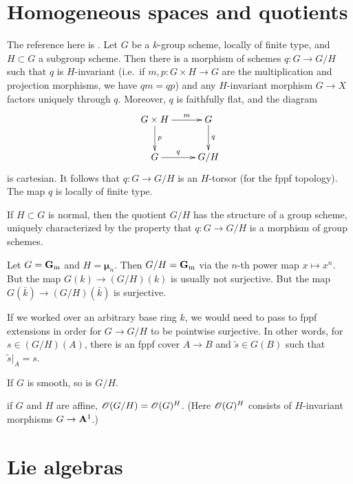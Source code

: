 \documentclass{article}
\begin{document}
\section{Homogeneous spaces and quotients}

The reference here is \cite[VI$_\mathrm{A}$ \S 3]{sga3}. Let $G$ be a $k$-group 
scheme, locally of finite type, and $H\subset G$ a subgroup scheme. Then there is 
a morphism of schemes $q:G\to G/H$ such that $q$ is $H$-invariant (i.e.~if 
$m,p:G\times H\to G$ are the multiplication and projection morphisms, we have 
$q m = q p$) and any $H$-invariant morphism $G\to X$ factors uniquely 
through $q$. Moreover, $q$ is faithfully flat, and the diagram 
\[\xymatrix{
  G\times H \ar[r]^-m \ar[d]^-p  
    & G \ar[d]^-q \\
  G \ar[r]^-q 
    & G/H 
}\]
is cartesian. It follows that $q:G\to G/H$ is an $H$-torsor (for the 
fppf topology). The map $q$ is locally of finite type. 

If $H\subset G$ is normal, then the quotient $G/H$ has the structure of 
a group scheme, uniquely characterized by the property that 
$q:G\to G/H$ is a morphism of group schemes. 

\begin{example}
Let $G=\mathbf{G}_{\mathrm{m}}$ and $H=\boldsymbol\mu_n$. Then $G/H=\mathbf{G}_{\mathrm{m}}$ via the 
$n$-th power map $x\mapsto x^n$. But the map $G(k) \to (G/H)(k)$ is usually 
not surjective. But the map $G(\bar k) \to (G/H)(\bar k)$ is surjective. 
\end{example}

If we worked over an arbitrary base ring $k$, we would need to pass to 
fppf extensions in order for $G\to G/H$ to be pointwise surjective. In 
other words, for $s\in (G/H)(A)$, there is an fppf cover $A\to B$ and 
$\widetilde s\in G(B)$ such that $\widetilde s|_A = s$. 

If $G$ is smooth, so is $G/H$. 

if $G$ and $H$ are affine, $\mathscr{O}(G/H)=\mathscr{O}(G)^H$. (Here 
$\mathscr{O}(G)^H$ consists of $H$-invariant morphisms $G\to \mathbf{A}^1$.)





\section{Lie algebras}
\end{document}
